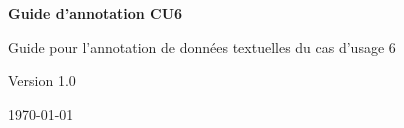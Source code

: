 \documentclass[11pt,a4paper]{book}
\begin{document}
\begin{titlepage}
    \centering
    \vspace*{2cm}
    
    {\Huge\bfseries Guide d'annotation CU6}
    
    \vspace{1.5cm}
    
    {\Large Guide pour l'annotation de données textuelles du cas d'usage 6}
    
    \vspace{2cm}
    
    {\large Version 1.0}
    
    \vfill
    
    {\large \today}
\end{titlepage}

\newpage

\tableofcontents
\newpage














\end{document}
